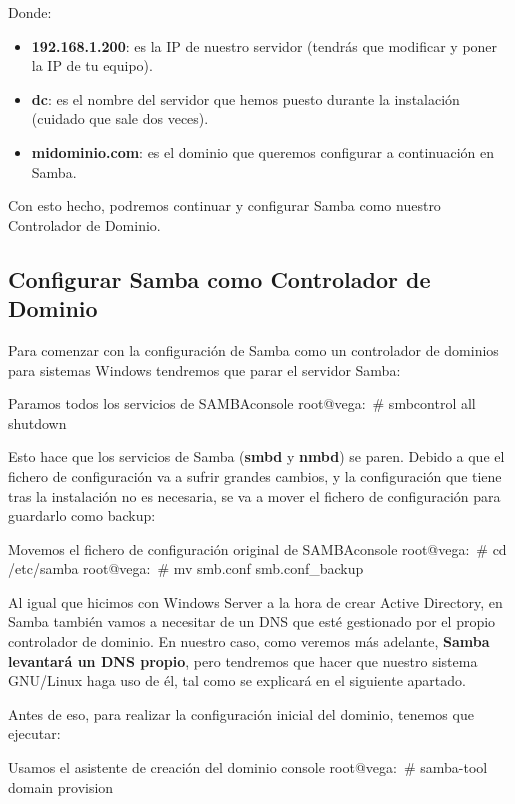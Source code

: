\documentclass{../../../yukibook.cls/yukibook}
\begin{document}
Donde:
\begin{itemize}
    \item \textbf{192.168.1.200}: es la IP de nuestro servidor (tendrás que modificar y poner la IP de tu equipo).
    \item \textbf{dc}: es el nombre del servidor que hemos puesto durante la instalación (cuidado que sale dos veces).
    \item \textbf{midominio.com}: es el dominio que queremos configurar a continuación en Samba.
\end{itemize}
Con esto hecho, podremos continuar y configurar Samba como nuestro Controlador de Dominio.

\subsection{Configurar Samba como Controlador de Dominio}
Para comenzar con la configuración de Samba como un controlador de dominios para sistemas Windows tendremos que parar el servidor Samba:

\begin{mycode}{Paramos todos los servicios de SAMBA}{console}{}
root@vega:~# smbcontrol all shutdown
\end{mycode}

Esto hace que los servicios de Samba (\textbf{smbd} y \textbf{nmbd}) se paren. Debido a que el fichero de configuración va a sufrir grandes cambios, y la configuración que tiene tras la instalación no es necesaria, se va a mover el fichero de configuración para guardarlo como backup:

\begin{mycode}{Movemos el fichero de configuración original de SAMBA}{console}{}
root@vega:~# cd /etc/samba
root@vega:~# mv smb.conf smb.conf_backup
\end{mycode}

Al igual que hicimos con Windows Server a la hora de crear Active Directory, en Samba también vamos a necesitar de un DNS que esté gestionado por el propio controlador de dominio. En nuestro caso, como veremos más adelante, \textbf{Samba levantará un DNS propio}, pero tendremos que hacer que nuestro sistema GNU/Linux haga uso de él, tal como se explicará en el siguiente apartado.

Antes de eso, para realizar la configuración inicial del dominio, tenemos que ejecutar:

\begin{mycode}{Usamos el asistente de creación del dominio }{console}{}
root@vega:~# samba-tool domain provision
\end{mycode}
\end{document}

